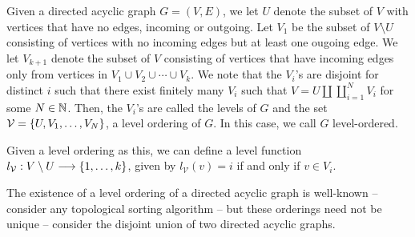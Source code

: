 \documentclass[./Thick_TQFTs_and_Quantum_Information.tex]{subfiles}
\begin{document}
\begin{enumerate}
\begin{figure}[H]
\begin{center}
\end{center}
\end{figure}
\begin{figure}[H]
\begin{center}
\qquad
{}
\qquad
{}
\end{center}
\end{figure}
\end{enumerate}

\begin{defn}
Given a directed acyclic graph $G = (V, E)$, we let $U$ denote the subset of
$V$ with vertices that have no edges, incoming or outgoing.
Let $V_1$ be the subset of $V \setminus U$ consisting of vertices with no
incoming edges but at least one ougoing edge.
We let $V_{k + 1}$ denote the subset of $V$ consisting of vertices that have
incoming edges only from vertices in $V_{1} \cup V_{2} \cup \cdots \cup V_{k}$.
We note that the $V_i$'s are disjoint for distinct $i$ such that there exist
finitely many $V_i$ such that $V = U \amalg \coprod_{i = 1}^{N} V_i$ for some
$N \in \mathbb{N}$. Then, the $V_i$'s are called the levels of $G$ and the set
$\mathcal{V} = \set{U, V_1, \dots, V_N}$, a level ordering of $G$. In this case,
we call $G$ level-ordered.

Given a level ordering as this, we can define a level function
$l_{\mathcal{V}} : V \setminus U \to \set{1, \dots, k}$, given by
$l_{\mathcal{V}}(v) = i$ if and only if $v \in V_i$.
\end{defn}

\begin{rmk}
The existence of a level ordering of a directed acyclic graph is well-known --
consider any topological sorting algorithm -- but these orderings need not be
unique -- consider the disjoint union of two directed acyclic graphs.
\end{rmk}
\end{document}
